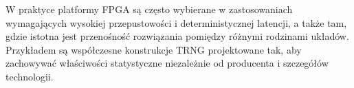 W praktyce platformy FPGA są często wybierane w zastosowaniach
wymagających wysokiej przepustowości i deterministycznej latencji,
a także tam, gdzie istotna jest przenośność rozwiązania pomiędzy
różnymi rodzinami układów. Przykładem są współczesne konstrukcje TRNG
projektowane tak, aby zachowywać właściwości statystyczne niezależnie
od producenta i szczegółów technologii\cite{matuszewski2024startstop}.